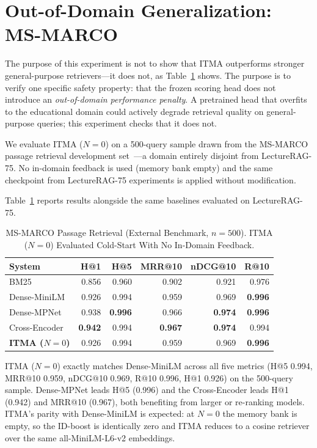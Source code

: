 \documentclass[journal]{IEEEtran}
\begin{document}
\section{Out-of-Domain Generalization: MS-MARCO}
\label{sec:msmarco}

The purpose of this experiment is not to show that ITMA outperforms
stronger general-purpose retrievers---it does not, as
Table~\ref{tab:msmarco} shows.  The purpose is to verify one specific
safety property: that the frozen scoring head does not introduce an
\emph{out-of-domain performance penalty}.  A pretrained head that
overfits to the educational domain could actively degrade retrieval
quality on general-purpose queries; this experiment checks that it
does not.

We evaluate ITMA ($N{=}0$) on a 500-query sample drawn from the
MS-MARCO passage retrieval development set~\cite{msmarco2016}---a
domain entirely disjoint from LectureRAG-75.  No in-domain feedback is
used (memory bank empty) and the same checkpoint from LectureRAG-75
experiments is applied without modification.

Table~\ref{tab:msmarco} reports results alongside the same baselines
evaluated on LectureRAG-75.

\begin{table}[!htbp]
\centering
\caption{MS-MARCO Passage Retrieval (External Benchmark, $n{=}500$).
ITMA ($N{=}0$) Evaluated Cold-Start With No In-Domain Feedback.}
\label{tab:msmarco}
\small
\setlength{\tabcolsep}{4pt}
\begin{tabular}{lrrrrr}
\toprule
System & H@1 & H@5 & MRR@10 & nDCG@10 & R@10 \\
\midrule
BM25 & 0.856 & 0.960 & 0.902 & 0.921 & 0.976 \\
Dense-MiniLM & 0.926 & 0.994 & 0.959 & 0.969 & \textbf{0.996} \\
Dense-MPNet & 0.938 & \textbf{0.996} & 0.966 & \textbf{0.974} & \textbf{0.996} \\
Cross-Encoder & \textbf{0.942} & 0.994 & \textbf{0.967} & \textbf{0.974} & 0.994 \\
\textbf{ITMA ($N{=}0$)} & 0.926 & 0.994 & 0.959 & 0.969 & \textbf{0.996} \\
\bottomrule
\end{tabular}
\end{table}

ITMA ($N{=}0$) exactly matches Dense-MiniLM across all five metrics
(H@5 0.994, MRR@10 0.959, nDCG@10 0.969, R@10 0.996, H@1 0.926) on the
500-query sample.  Dense-MPNet leads H@5 (0.996) and the Cross-Encoder
leads H@1 (0.942) and MRR@10 (0.967), both benefiting from larger or
re-ranking models.  ITMA's parity with Dense-MiniLM is expected: at
$N{=}0$ the memory bank is empty, so the ID-boost is identically zero
and ITMA reduces to a cosine retriever over the same all-MiniLM-L6-v2
embeddings.
\end{document}
